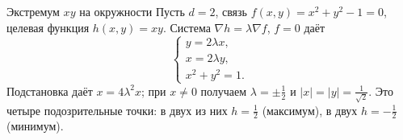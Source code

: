 \begin{Example}{Экстремум $xy$ на окружности}{}
	Пусть $d=2$, связь $f(x,y)=x^2+y^2-1=0$, целевая функция $h(x,y)=xy$. Система
	$\nabla h=\lambda\nabla f$, $f=0$ даёт
	\[
	\begin{cases}
		y=2\lambda x,\\
		x=2\lambda y,\\
		x^2+y^2=1.
	\end{cases}
	\]
	Подстановка даёт $x=4\lambda^2 x$; при $x\ne 0$ получаем $\lambda=\pm\tfrac12$ и
	$|x|=|y|=\tfrac{1}{\sqrt2}$. Это четыре подозрительные точки: в двух из них
	$h=\tfrac12$ (максимум), в двух $h=-\tfrac12$ (минимум).
\end{Example}
